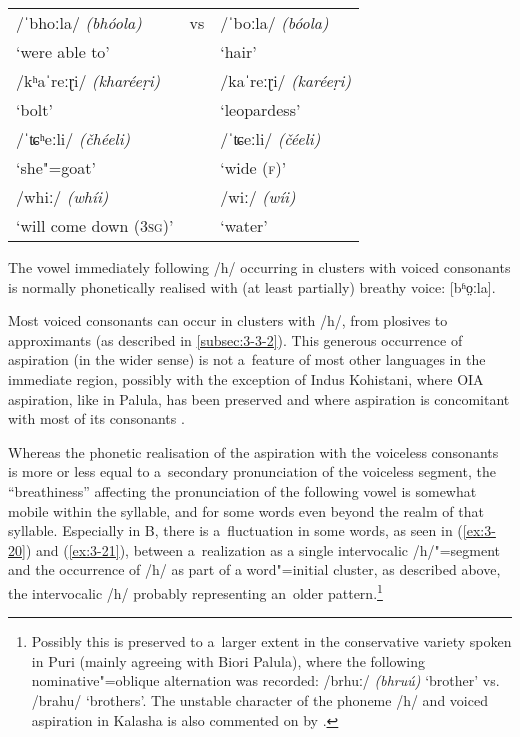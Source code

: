 \begin{exe}
\extab
\label{ex:3-18}
\begin{tabularx}{116mm}{ l l l }
/ˈbhoːla/ \textit{(bhóola)} &
vs &
/ˈboːla/ \textit{(bóola)}\\
`were able to' &
&
`hair'\\
/kʰaˈreːɽi/ \textit{(kharéeṛi)} &
&
/kaˈreːɽi/ \textit{(karéeṛi)}\\
`bolt' &
&
`leopardess'\\
/ˈʨʰeːli/ \textit{(čhéeli)} &
&
/ˈʨeːli/ \textit{(čéeli)}\\
`she"=goat' &
&
`wide (\textsc{f})'\\
/whiː/ \textit{(whíi)} &
&
/wiː/ \textit{(wíi)}\\
`will come down (\textsc{3sg})' &
&
`water'\\
\end{tabularx}
\end{exe}


The vowel immediately following /h/ occurring in clusters with voiced consonants is normally phonetically realised with (at least partially) breathy voice: [bʱo̤ːla]. 


Most voiced consonants can occur in clusters with /h/, from plosives to approximants (as described in \ref{subsec:3-3-2}). This generous occurrence of aspiration (in the wider sense) is not a~feature of most other languages in the immediate region, possibly with the exception of Indus Kohistani, where OIA aspiration, like in Palula, has been preserved and where aspiration is concomitant with most of its consonants \citep[19--25]{hallberghallberg1999}. 


Whereas the phonetic realisation of the aspiration with the voiceless consonants is more or less equal to a~secondary pronunciation of the voiceless segment, the ``breathiness'' affecting the pronunciation of the following vowel is somewhat mobile within the syllable, and for some words even beyond the realm of that syllable. Especially in B, there is a~fluctuation in some words, as seen in (\ref{ex:3-20}) and (\ref{ex:3-21}), between a~realization as a single intervocalic /h/"=segment and the occurrence of /h/ as part of a word"=initial cluster, as described above, the intervocalic /h/ probably representing an~older pattern.\footnote{Possibly this is preserved to a~larger extent in the conservative variety spoken in Puri (mainly agreeing with Biori Palula), where the following nominative"=oblique alternation was recorded: /brhuː/ \textit{(bhruú)} `brother' vs. /brahu/ `brothers'. The unstable character of the phoneme /h/ and voiced aspiration in Kalasha is also commented on by \citet[50]{morchheegaard1997}.}

